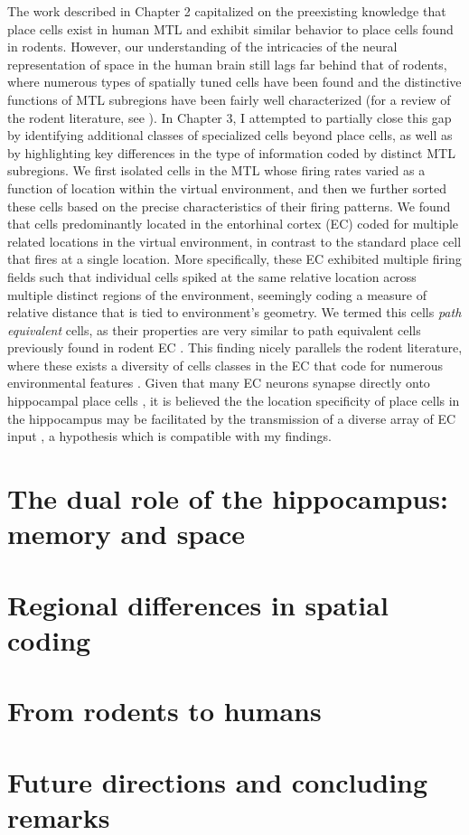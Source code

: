 The work described in Chapter 2 capitalized on the preexisting knowledge that place cells exist in human MTL and exhibit similar behavior to place cells found in rodents. However, our understanding of the intricacies of the neural representation of space in the human brain still lags far behind that of rodents, where numerous types of spatially tuned cells have been found and the distinctive functions of MTL subregions have been fairly well characterized (for a review of the rodent literature, see \cite{MoseEtal08}). In Chapter 3, I attempted to partially close this gap by identifying additional classes of specialized cells beyond place cells, as well as by highlighting key differences in the type of information coded by distinct MTL subregions. We first isolated cells in the MTL whose firing rates varied as a function of location within the virtual environment, and then we further sorted these cells based on the precise characteristics of their firing patterns. We found that cells predominantly located in the entorhinal cortex (EC) coded for multiple related locations in the virtual environment, in contrast to the standard place cell that  fires at a single location. More specifically, these EC exhibited multiple firing fields such that individual cells spiked at the same relative location across multiple distinct regions of the environment, seemingly coding a measure of relative distance that is tied to environment's geometry. We termed this cells \textit{path equivalent} cells, as their properties are very similar to path equivalent cells previously found in rodent EC \citep{FranEtal00}. This finding nicely parallels the rodent literature, where these exists a diversity of cells classes in the EC that code for numerous environmental features \citep{HartEtal05,FyhnEtal04,DerdEtal09,SargEtal06,SolsEtal08}. Given that many EC neurons synapse directly onto hippocampal place cells \citep{ZhanEtal13}, it is believed the the location specificity of place cells in the hippocampus may be facilitated by the transmission of a diverse array of EC input \citep{MoseMose13}, a hypothesis which is compatible with my findings.





\section{The dual role of the hippocampus: memory and space}

\section{Regional differences in spatial coding}

\section{From rodents to humans}

\section{Future directions and concluding remarks}